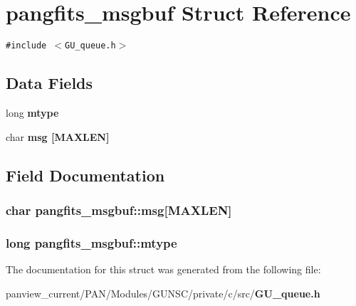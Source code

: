 \section{pangfits\_\-msgbuf Struct Reference}
\label{structpangfits__msgbuf}
{\tt \#include $<$GU\_\-queue.h$>$}

\subsection*{Data Fields}
\begin{CompactItemize}
\item 
long \bf{mtype}
\item 
char \bf{msg} [MAXLEN]
\end{CompactItemize}


\subsection{Field Documentation}
\subsubsection{\setlength{\rightskip}{0pt plus 5cm}char \bf{pangfits\_\-msgbuf::msg}[MAXLEN]}\label{structpangfits__msgbuf_a71f417fd86a21f8293dfe454c2ab5a8}


\subsubsection{\setlength{\rightskip}{0pt plus 5cm}long \bf{pangfits\_\-msgbuf::mtype}}\label{structpangfits__msgbuf_dee0e0a3569eac5f18b8eb9e716238e6}




The documentation for this struct was generated from the following file:\begin{CompactItemize}
\item 
panview\_\-current/PAN/Modules/GUNSC/private/c/src/\bf{GU\_\-queue.h}\end{CompactItemize}
